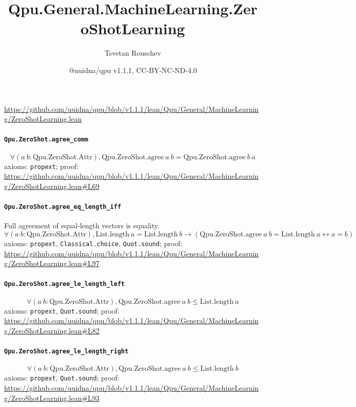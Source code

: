 \documentclass[11pt]{article}
\title{Qpu.General.MachineLearning.ZeroShotLearning}
\author{Tsvetan Rouschev}
\date{@uuidna/qpu v1.1.1, CC-BY-NC-ND-4.0}
\begin{document}
\maketitle
\noindent\url{https://github.com/uuidna/qpu/blob/v1.1.1/lean/Qpu/General/MachineLearning/ZeroShotLearning.lean}

\paragraph{\texttt{Qpu.ZeroShot.agree\_comm}}
\[ \forall (a\ b : \mathrm{Qpu.ZeroShot.Attr}), \mathrm{Qpu.ZeroShot.agree}\ a\ b = \mathrm{Qpu.ZeroShot.agree}\ b\ a \]
\noindent axioms: \texttt{propext}; proof: \url{https://github.com/uuidna/qpu/blob/v1.1.1/lean/Qpu/General/MachineLearning/ZeroShotLearning.lean\#L69}

\paragraph{\texttt{Qpu.ZeroShot.agree\_eq\_length\_iff}}
Full agreement of equal-length vectors is equality.
\[ \forall (a\ b : \mathrm{Qpu.ZeroShot.Attr}), \mathrm{List.length}\ a = \mathrm{List.length}\ b \to (\mathrm{Qpu.ZeroShot.agree}\ a\ b = \mathrm{List.length}\ a \leftrightarrow a = b) \]
\noindent axioms: \texttt{propext}, \texttt{Classical.choice}, \texttt{Quot.sound}; proof: \url{https://github.com/uuidna/qpu/blob/v1.1.1/lean/Qpu/General/MachineLearning/ZeroShotLearning.lean\#L97}

\paragraph{\texttt{Qpu.ZeroShot.agree\_le\_length\_left}}
\[ \forall (a\ b : \mathrm{Qpu.ZeroShot.Attr}), \mathrm{Qpu.ZeroShot.agree}\ a\ b \le \mathrm{List.length}\ a \]
\noindent axioms: \texttt{propext}, \texttt{Quot.sound}; proof: \url{https://github.com/uuidna/qpu/blob/v1.1.1/lean/Qpu/General/MachineLearning/ZeroShotLearning.lean\#L82}

\paragraph{\texttt{Qpu.ZeroShot.agree\_le\_length\_right}}
\[ \forall (a\ b : \mathrm{Qpu.ZeroShot.Attr}), \mathrm{Qpu.ZeroShot.agree}\ a\ b \le \mathrm{List.length}\ b \]
\noindent axioms: \texttt{propext}, \texttt{Quot.sound}; proof: \url{https://github.com/uuidna/qpu/blob/v1.1.1/lean/Qpu/General/MachineLearning/ZeroShotLearning.lean\#L93}
\end{document}
